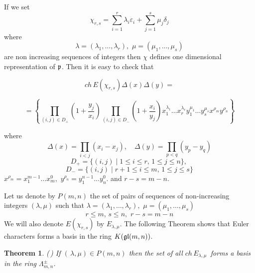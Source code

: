 \documentclass[12pt,reqno]{amsart}
\newtheorem{thm}{Theorem}[section]
\begin{document}
If we set 
$$
\chi_{r,s}=\sum_{i=1}^r\lambda_i\varepsilon_i+\sum_{j=1}^s\mu_j\delta_j
$$
where 
$$
\lambda=(\lambda_1,\dots,\lambda_r),\,\,\mu=(\mu_1,\dots,\mu_s)
$$
are non increasing sequences of integers
then $\chi$ defines one dimensional representation of $\frak p$. Then it is easy to check that 


$$
ch\,E(\chi_{r,s})\Delta(x)\Delta(y)=
$$

\begin{equation}
=\left\{\prod_{(i,j)\in D_{+}}\left(1+\frac{y_j}{x_i}\right)\prod_{(i,j)\in D_{-}}\left(1+\frac{x_i}{y_j}\right)x_1^{\lambda_1}\dots x_r^{\lambda_r}y_1^{\mu_1}\dots y_s^{\mu_s}x^{\rho_m}y^{\rho_n}\right\}
\end{equation}

where 
$$
\Delta(x)=\prod_{i<j}(x_i-x_j),\quad \Delta(y)=\prod_{p<q}(y_p-y_q)
$$
$$
D_+=\{(i,j)\mid 1\le i\le r,\, 1\le j\le n\},\,
$$
$$
 D_{-}=\{(i,j)\mid r+1\le i\le m,\, 1\le j\le s\}
$$
$
 x^{\rho_m}=x_1^{m-1}\dots x_m^{0},\,\, y^{\rho_n}=y_1^{n-1}\dots y_n^{0}.
$
and $r-s=m-n$.







  Let us denote by $P(m,n)$ the set of pairs of sequences of non-increasing  integers  $(\lambda,\mu)$ such that $\lambda=(\lambda_1,\dots,\lambda_r),\,\,\mu=(\mu_1,\dots,\mu_s)$
$$
 r\le m,\, s \le n,\,\,  r- s=m-n
$$
We will  also denote  $E(\chi_{r,s})$ by $E_{\lambda,\mu}$.
The following Theorem shows that Euler characters forms a basis in the ring $K(\frak{gl}(m,n))$.
\begin{thm} \label{basis}(\,\cite{Ser}) If   $(\,\lambda,\mu)\in P(m,n)$ then  the set of all $
ch\,E_{\lambda,\mu}\,
$
forms a basis in the ring  $\Lambda^{\pm}_{m,n}$.
\end{thm}
\end{document}
